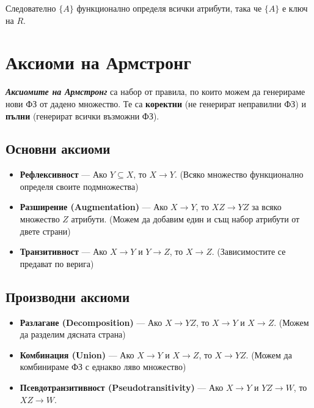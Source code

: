 \documentclass{scrartcl}
\begin{document}
\begin{FlushLeft}
Следователно $\{A\}$ функционално определя всички атрибути, така че $\{A\}$ е ключ на $R$.

\section{Аксиоми на Армстронг}

\textbf{\textit{Аксиомите на Армстронг}} са набор от правила, по които можем да генерираме нови ФЗ от дадено множество. Те са \textbf{коректни} (не генерират неправилни ФЗ) и \textbf{пълни} (генерират всички възможни ФЗ).

\subsection{Основни аксиоми}

\begin{itemize}
    \item \textbf{Рефлексивност} --- Ако $Y \subseteq X$, то $X \rightarrow Y$. (Всяко множество функционално определя своите подмножества)
    
    \item \textbf{Разширение (Augmentation)} --- Ако $X \rightarrow Y$, то $XZ \rightarrow YZ$ за всяко множество $Z$ атрибути. (Можем да добавим един и същ набор атрибути от двете страни)
    
    \item \textbf{Транзитивност} --- Ако $X \rightarrow Y$ и $Y \rightarrow Z$, то $X \rightarrow Z$. (Зависимостите се предават по верига)
\end{itemize}

\subsection{Производни аксиоми}

\begin{itemize}
    \item \textbf{Разлагане (Decomposition)} --- Ако $X \rightarrow YZ$, то $X \rightarrow Y$ и $X \rightarrow Z$. (Можем да разделим дясната страна)
    
    \item \textbf{Комбинация (Union)} --- Ако $X \rightarrow Y$ и $X \rightarrow Z$, то $X \rightarrow YZ$. (Можем да комбинираме ФЗ с еднакво ляво множество)
    
    \item \textbf{Псевдотранзитивност (Pseudotransitivity)} --- Ако $X \rightarrow Y$ и $YZ \rightarrow W$, то $XZ \rightarrow W$.
\end{itemize}


\end{FlushLeft}
\end{document}
